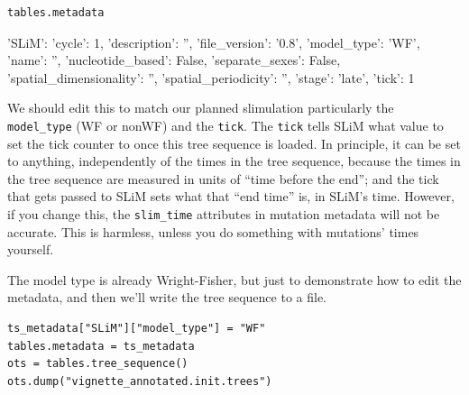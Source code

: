 \documentclass[12pt]{article}
\begin{document}
\begin{listing}[H]
    \begin{verbatim}
tables.metadata
    \end{verbatim}
\end{listing}
\begin{pycon}
{
    'SLiM': {
        'cycle': 1, 
        'description': '', 
        'file_version': '0.8', 
        'model_type': 'WF', 
        'name': '', 
        'nucleotide_based': False, 
        'separate_sexes': False, 
        'spatial_dimensionality': '', 
        'spatial_periodicity': '', 
        'stage': 'late', 
        'tick': 1
        }
}
\end{pycon}

We should edit this to match our planned slimulation particularly the \verb|model_type| (WF or nonWF) and the \verb|tick|.
The \verb|tick| tells SLiM what value to set the tick counter to once this tree sequence is loaded.
In principle, it can be set to anything, independently of the times in the tree sequence,
because the times in the tree sequence are measured in units of “time before the end”;
and the tick that gets passed to SLiM sets what that “end time” is, in SLiM’s time.
However, if you change this, the \verb|slim_time| attributes in mutation metadata will not be accurate.
This is harmless, unless you do something with mutations’ times yourself.

The model type is already Wright-Fisher,
but just to demonstrate how to edit the metadata,
and then we’ll write the tree sequence to a file.

\begin{listing}[H]
    \begin{verbatim}
ts_metadata["SLiM"]["model_type"] = "WF"
tables.metadata = ts_metadata
ots = tables.tree_sequence()
ots.dump("vignette_annotated.init.trees")
    \end{verbatim}
\end{listing}   
\end{document}

